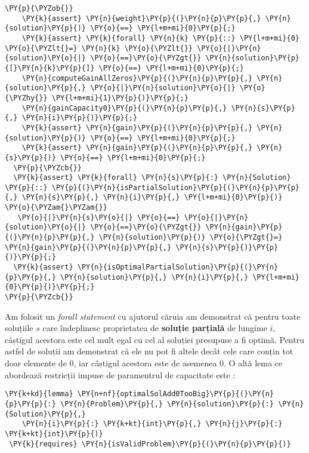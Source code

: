 \begin{sloppypar}
\begin{Verbatim}[commandchars=\\\{\}]
  \PY{p}{\PYZob{}}
    \PY{k}{assert} \PY{n}{weight}\PY{p}{(}\PY{n}{p}\PY{p}{,} \PY{n}{solution}\PY{p}{)} \PY{o}{==} \PY{l+m+mi}{0}\PY{p}{;}
    \PY{k}{assert} \PY{k}{forall} \PY{n}{k} \PY{p}{::} \PY{l+m+mi}{0} \PY{o}{\PYZlt{}=} \PY{n}{k} \PY{o}{\PYZlt{}} \PY{o}{|}\PY{n}{solution}\PY{o}{|} \PY{o}{==}\PY{o}{\PYZgt{}} \PY{n}{solution}\PY{p}{[}\PY{n}{k}\PY{p}{]} \PY{o}{==} \PY{l+m+mi}{0}\PY{p}{;}
    \PY{n}{computeGainAllZeros}\PY{p}{(}\PY{n}{p}\PY{p}{,} \PY{n}{solution}\PY{p}{,} \PY{o}{|}\PY{n}{solution}\PY{o}{|} \PY{o}{\PYZhy{}} \PY{l+m+mi}{1}\PY{p}{)}\PY{p}{;}
    \PY{n}{gainCapacity0}\PY{p}{(}\PY{n}{p}\PY{p}{,} \PY{n}{s}\PY{p}{,} \PY{n}{i}\PY{p}{)}\PY{p}{;}
    \PY{k}{assert} \PY{n}{gain}\PY{p}{(}\PY{n}{p}\PY{p}{,} \PY{n}{solution}\PY{p}{)} \PY{o}{==} \PY{l+m+mi}{0}\PY{p}{;}
    \PY{k}{assert} \PY{n}{gain}\PY{p}{(}\PY{n}{p}\PY{p}{,} \PY{n}{s}\PY{p}{)} \PY{o}{==} \PY{l+m+mi}{0}\PY{p}{;}
  \PY{p}{\PYZcb{}}
  \PY{k}{assert} \PY{k}{forall} \PY{n}{s}\PY{p}{:} \PY{n}{Solution} \PY{p}{::} \PY{p}{(}\PY{n}{isPartialSolution}\PY{p}{(}\PY{n}{p}\PY{p}{,} \PY{n}{s}\PY{p}{,} \PY{n}{i}\PY{p}{,} \PY{l+m+mi}{0}\PY{p}{)} \PY{o}{\PYZam{}\PYZam{}} 
   \PY{o}{|}\PY{n}{s}\PY{o}{|} \PY{o}{==} \PY{o}{|}\PY{n}{solution}\PY{o}{|} \PY{o}{==}\PY{o}{\PYZgt{}} \PY{n}{gain}\PY{p}{(}\PY{n}{p}\PY{p}{,} \PY{n}{solution}\PY{p}{)} \PY{o}{\PYZgt{}=} \PY{n}{gain}\PY{p}{(}\PY{n}{p}\PY{p}{,} \PY{n}{s}\PY{p}{)}\PY{p}{)}\PY{p}{;}
  \PY{k}{assert} \PY{n}{isOptimalPartialSolution}\PY{p}{(}\PY{n}{p}\PY{p}{,} \PY{n}{solution}\PY{p}{,} \PY{n}{i}\PY{p}{,} \PY{l+m+mi}{0}\PY{p}{)}\PY{p}{;}
\PY{p}{\PYZcb{}}
\end{Verbatim}
\hspace{4mm} Am folosit un \textit{forall statement} cu ajutorul căruia am demonstrat că pentru toate soluțiile $s$ care îndeplinesc proprietatea de \textbf{soluție parțială} de lungime $i$, câștigul acestora este cel mult egal cu cel al soluției presupuse a fi optimă. Pentru astfel de soluții am demonstrat că ele nu pot fi altele decât cele care conțin tot doar elemente de 0, iar câștigul acestora este de asemenea 0. 
O altă lema ce abordează restricții impuse de paramentrul de capacitate este :
\begin{Verbatim}[commandchars=\\\{\}]
\PY{k+kd}{lemma} \PY{n+nf}{optimalSolAdd0TooBig}\PY{p}{(}\PY{n}{p}\PY{p}{:} \PY{n}{Problem}\PY{p}{,} \PY{n}{solution}\PY{p}{:} \PY{n}{Solution}\PY{p}{,} 
    \PY{n}{i}\PY{p}{:} \PY{k+kt}{int}\PY{p}{,} \PY{n}{j}\PY{p}{:} \PY{k+kt}{int}\PY{p}{)}
 \PY{k}{requires} \PY{n}{isValidProblem}\PY{p}{(}\PY{n}{p}\PY{p}{)}

\end{Verbatim}
\end{sloppypar}

